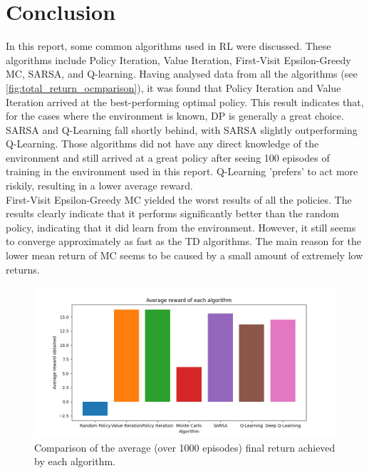 \documentclass{class}
\begin{document}
\section{Conclusion}
In this report, some common algorithms used in RL were discussed. These algorithms include Policy Iteration, Value Iteration, First-Visit Epsilon-Greedy MC, SARSA, and Q-learning. Having analysed data from all the algorithms (see \autoref{fig:total_return_ocmparison}), it was found that Policy Iteration and Value Iteration arrived at the best-performing optimal policy. This result indicates that, for the cases where the environment is known, DP is generally a great choice.
\\[0.3cm]
SARSA and Q-Learning fall shortly behind, with SARSA slightly outperforming Q-Learning. Those algorithms did not have any direct knowledge of the environment and still arrived at a great policy after seeing 100 episodes of training in the environment used in this report. Q-Learning 'prefers' to act more riskily, resulting in a lower average reward.
\\[0.3cm]
First-Visit Epsilon-Greedy MC yielded the worst results of all the policies. The results clearly indicate that it performs significantly better than the random policy, indicating that it did learn from the environment. However, it still seems to converge approximately as fast as the TD algorithms. The main reason for the lower mean return of MC seems to be caused by a small amount of extremely low returns.
\begin{figure}[H]
    \centering
    \includegraphics[width=0.5\linewidth]{../plots/comparison/total_return_comparison.png}
    \caption{Comparison of the average (over 1000 episodes) final return achieved by each algorithm.}
    \label{fig:total_return_ocmparison}
\end{figure}

\printbibliography[title={References}]
\end{document}
